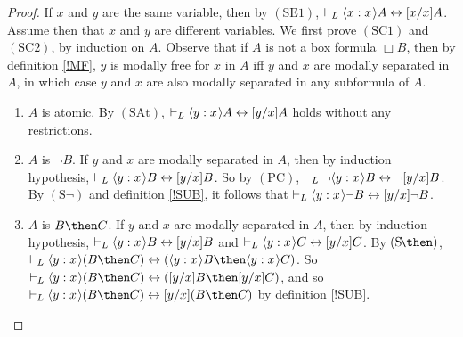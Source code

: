 \documentclass[11pt]{woarticle}
\theoremstyle{break}
\theoremstyle{nonumberplain}
\newcommand{\1}{\;\,|\;\,}
\renewcommand{\t}[1]{\ensuremath{\langle #1  \makebox[.2ex]{}\rangle}}
\newcommand{\T}[1]{\ensuremath{(\mathrm{ #1})}}
\begin{document}
\begin{proof}
  If $x$ and $y$ are the same variable, then by \T{SE1}, $\vdash_L
  \t{x:x}A \leftrightarrow [x/x]A$.  Assume then that $x$ and $y$ are
  different variables. We first prove \T{SC1} and \T{SC2}, by
  induction on $A$. Observe that if $A$ is not a box formula $\Box B$,
  then by definition \ref{!MF}, $y$ is modally free for $x$ in $A$ iff
  $y$ and $x$ are modally separated in $A$, in which case $y$ and $x$
  are also modally separated in any subformula of $A$.

  \begin{enumerate}

  \item $A$ is atomic.\; By \T{SAt}, $\vdash_{L} \t{y:x}A
    \leftrightarrow [y/x]A$ holds without any restrictions.

  \item $A$ is $\neg B$.\; If $y$ and $x$ are modally separated
    in $A$, then by induction hypothesis, $\vdash_{L} \t{y:x}B
    \leftrightarrow [y/x]B$. So by \T{PC}, $\vdash_L \neg \t{y:x}B
    \leftrightarrow \neg [y/x]B$. By \T{S\neg} and definition
    \ref{!SUB}, it follows that $\vdash_L \t{y:x} \neg B
    \leftrightarrow [y/x]\neg B$.

  \item $A$ is $B\then C$.\; If $y$ and $x$ are modally separated in
    $A$, then by induction hypothesis, $\vdash_L \t{y:x}B
    \leftrightarrow [y/x]B$ and $\vdash_L \t{y:x}C \leftrightarrow
    [y/x]C$. By \T{S\!\then}, $\vdash_L \t{y:x}(B \then C)
    \leftrightarrow (\t{y:x}B \then \t{y:x}C)$. So $\vdash_L \t{y:x}(B
    \then C) \leftrightarrow ([y/x]B \then [y/x]C)$, and so $\vdash_L
    \t{y:x}(B \then C) \leftrightarrow [y/x](B \then C)$ by definition
    \ref{!SUB}.


\end{enumerate}
\end{proof}
\end{document}
